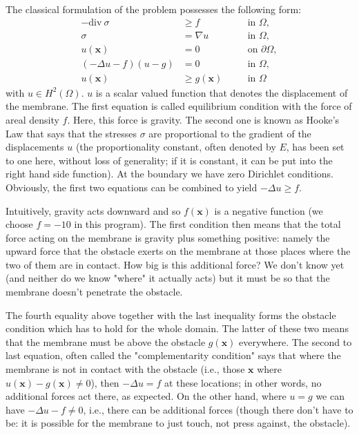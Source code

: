 \documentclass{article}
\begin{document}
The classical formulation of the problem possesses the following form:
\begin{align*}
 -\textrm{div}\ \sigma &\geq f & &\quad\text{in } \Omega,\\
 \sigma &= \nabla u & &\quad\text{in } \Omega,\\
 u(\mathbf x) &= 0 & &\quad\text{on }\partial\Omega,\\
(-\Delta u - f)(u - g) &= 0 & &\quad\text{in } \Omega,\\
 u(\mathbf x) &\geq g(\mathbf x) & &\quad\text{in } \Omega
\end{align*}
with $u\in H^2(\Omega)$.  $u$ is a scalar valued function that denotes the
displacement of the membrane. The first equation is called equilibrium
condition with the force of areal density $f$. Here, this force is
gravity. The second one is known as Hooke's Law that says that the stresses
$\sigma$ are proportional to the gradient of the displacements $u$ (the
proportionality constant, often denoted by $E$, has been set to one here,
without loss of generality; if it is constant, it can be put into the right
hand side function). At the boundary we have zero Dirichlet
conditions. Obviously, the first two equations can be combined to yield
$-\Delta u \ge f$.

Intuitively, gravity acts downward and so $f(\mathbf x)$ is a negative
function (we choose $f=-10$ in this program). The first condition then means
that the total force acting on the membrane is gravity plus something
positive: namely the upward force that the obstacle exerts on the membrane at
those places where the two of them are in contact. How big is this additional
force? We don't know yet (and neither do we know "where" it actually acts) but
it must be so that the membrane doesn't penetrate the obstacle.

The fourth equality above together with the last inequality forms the
obstacle condition which has to hold for the whole domain. The latter of these
two means that the membrane must be above the obstacle $g(\mathbf x)$
everywhere. The second to last equation, often called the "complementarity
condition" says that where the membrane is not in contact with the obstacle
(i.e., those $\mathbf x$ where $u(\mathbf x) - g(\mathbf x) \neq 0$), then
$-\Delta u=f$ at these locations; in other words, no additional forces act
there, as expected. On the other hand, where $u=g$ we can have $-\Delta u-f
\neq 0$, i.e., there can be additional forces (though there don't have to be:
it is possible for the membrane to just touch, not press against, the obstacle).
\end{document}
